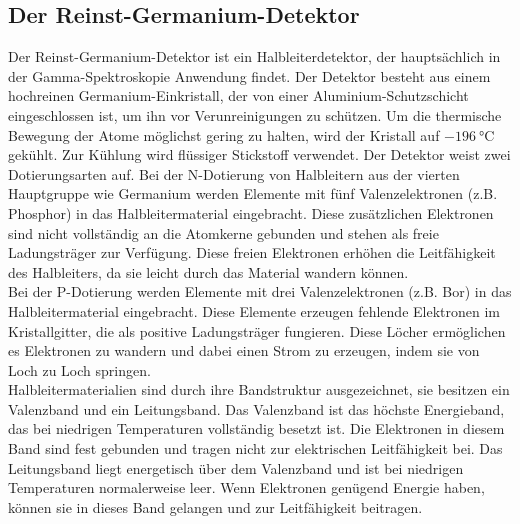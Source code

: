 \subsection{Der Reinst-Germanium-Detektor}
Der Reinst-Germanium-Detektor ist ein Halbleiterdetektor, der hauptsächlich in der Gamma-Spektroskopie Anwendung findet. Der Detektor besteht aus
einem hochreinen Germanium-Einkristall, der von einer Aluminium-Schutzschicht eingeschlossen ist, um ihn vor Verunreinigungen zu schützen. Um die 
thermische Bewegung der Atome möglichst gering zu halten, wird der Kristall auf $\qty{-196}{\celsius}$ gekühlt. Zur Kühlung wird flüssiger Stickstoff verwendet.
Der Detektor weist zwei Dotierungsarten auf.
Bei der N-Dotierung von Halbleitern aus der vierten Hauptgruppe wie Germanium werden Elemente mit fünf Valenzelektronen (z.B. Phosphor) in das Halbleitermaterial eingebracht. 
Diese zusätzlichen Elektronen sind nicht vollständig an die Atomkerne gebunden und stehen als freie Ladungsträger zur Verfügung. Diese freien Elektronen
erhöhen die Leitfähigkeit des Halbleiters, da sie leicht durch das Material wandern können.\\
Bei der P-Dotierung werden Elemente mit drei Valenzelektronen (z.B. Bor) in das Halbleitermaterial eingebracht.
Diese Elemente erzeugen fehlende Elektronen im Kristallgitter, die als positive Ladungsträger fungieren. Diese Löcher ermöglichen es Elektronen
zu wandern und dabei einen Strom zu erzeugen, indem sie von Loch zu Loch springen.\\
Halbleitermaterialien sind durch ihre Bandstruktur ausgezeichnet, sie besitzen ein Valenzband und ein Leitungsband.
Das Valenzband ist das höchste Energieband, das bei niedrigen Temperaturen vollständig besetzt ist. Die Elektronen in diesem Band sind fest
gebunden und tragen nicht zur elektrischen Leitfähigkeit bei. Das Leitungsband liegt energetisch über dem Valenzband und ist bei niedrigen Temperaturen 
normalerweise leer. Wenn Elektronen genügend Energie haben, können sie in dieses Band gelangen und zur Leitfähigkeit beitragen.


